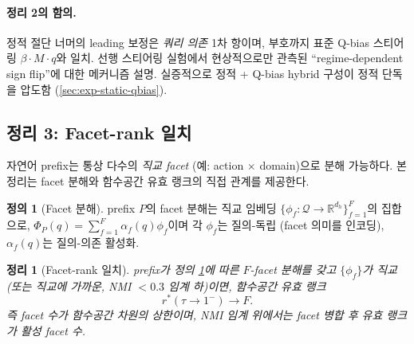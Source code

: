 \documentclass[11pt]{article}
\newtheorem{theorem}{정리}
\theoremstyle{definition}
\newtheorem{definition}{정의}
\newcommand{\R}{\mathbb{R}}
\newcommand{\Phip}{\Phi_P}
\newcommand{\dh}{d_h}
\begin{document}
\paragraph{정리 2의 함의.}
정적 절단 너머의 leading 보정은 \emph{쿼리 의존} 1차 항이며, 부호까지 표준 Q-bias 스티어링 $\beta\cdot M\cdot q$와 일치. 선행 스티어링 실험에서 현상적으로만 관측된 ``regime-dependent sign flip''에 대한 메커니즘 설명. 실증적으로 정적 + Q-bias hybrid 구성이 정적 단독을 압도함 (\cref{sec:exp-static-qbias}).

\subsection{정리 3: Facet-rank 일치}
\label{sec:thm3}

자연어 prefix는 통상 다수의 \emph{직교 facet} (예: action $\times$ domain)으로 분해 가능하다. 본 정리는 facet 분해와 함수공간 유효 랭크의 직접 관계를 제공한다.

\begin{definition}[Facet 분해]
\label{def:facet-decomp}
prefix $P$의 facet 분해는 직교 임베딩 $\{\phi_f: \mathcal{Q} \to \R^{\dh}\}_{f=1}^F$의 집합으로, $\Phip(q) = \sum_{f=1}^F \alpha_f(q) \phi_f$이며 각 $\phi_f$는 질의-독립 (facet 의미를 인코딩), $\alpha_f(q)$는 질의-의존 활성화.
\end{definition}

\begin{theorem}[Facet-rank 일치]
\label{thm:facet-rank}
prefix가 정의 \ref{def:facet-decomp}에 따른 $F$-facet 분해를 갖고 $\{\phi_f\}$가 직교 (또는 직교에 가까운, NMI $< 0.3$ 임계 하)이면, 함수공간 유효 랭크
\begin{equation}
r^*(\tau \to 1^-) \to F.
\label{eq:facet-rank}
\end{equation}
즉 facet 수가 함수공간 차원의 \emph{상한}이며, NMI 임계 위에서는 facet 병합 후 유효 랭크가 활성 facet 수.
\end{theorem}
\end{document}
